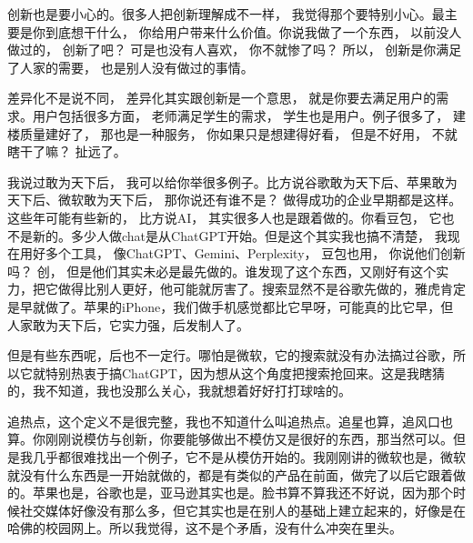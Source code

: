 
创新也是要小心的。很多人把创新理解成不一样， 我觉得那个要特别小心。最主要是你到底想干什么， 你给用户带来什么价值。你说我做了一个东西， 以前没人做过的， 创新了吧？ 可是也没有人喜欢， 你不就惨了吗？ 所以， 创新是你满足了人家的需要， 也是别人没有做过的事情。

差异化不是说不同， 差异化其实跟创新是一个意思， 就是你要去满足用户的需求。用户包括很多方面， 老师满足学生的需求， 学生也是用户。例子很多了， 建楼质量建好了， 那也是一种服务， 你如果只是想建得好看， 但是不好用， 不就瞎干了嘛？ 扯远了。


我说过敢为天下后， 我可以给你举很多例子。比方说谷歌敢为天下后、苹果敢为天下后、微软敢为天下后， 那你说还有谁不是？ 做得成功的企业早期都是这样。这些年可能有些新的， 比方说AI， 其实很多人也是跟着做的。你看豆包， 它也不是新的。多少人做chat是从ChatGPT开始。但是这个其实我也搞不清楚， 我现在用好多个工具， 像ChatGPT、Gemini、Perplexity， 豆包也用， 你说他们创新吗？ 创， 但是他们其实未必是最先做的。谁发现了这个东西，又刚好有这个实力，把它做得比别人更好，他可能就厉害了。搜索显然不是谷歌先做的，雅虎肯定是早就做了。苹果的iPhone，我们做手机感觉都比它早呀，可能真的比它早，但人家敢为天下后，它实力强，后发制人了。

但是有些东西呢，后也不一定行。哪怕是微软，它的搜索就没有办法搞过谷歌，所以它就特别热衷于搞ChatGPT，因为想从这个角度把搜索抢回来。这是我瞎猜的，我不知道，我也没那么关心，我就想着好好打打球啥的。


追热点，这个定义不是很完整，我也不知道什么叫追热点。追星也算，追风口也算。你刚刚说模仿与创新，你要能够做出不模仿又是很好的东西，那当然可以。但是我几乎都很难找出一个例子，它不是从模仿开始的。我刚刚讲的微软也是，微软就没有什么东西是一开始就做的，都是有类似的产品在前面，做完了以后它跟着做的。苹果也是，谷歌也是，亚马逊其实也是。脸书算不算我还不好说，因为那个时候社交媒体好像没有那么多，但它其实也是在别人的基础上建立起来的，好像是在哈佛的校园网上。所以我觉得，这不是个矛盾，没有什么冲突在里头。



